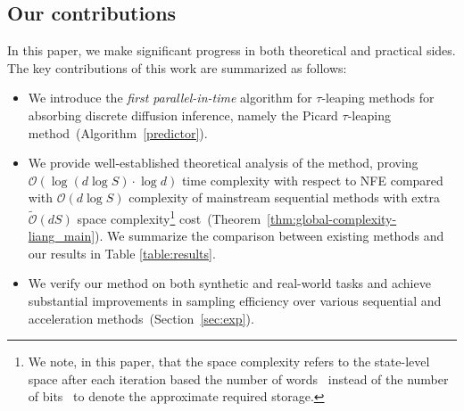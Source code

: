 \documentclass{article}
\begin{document}
\subsection{Our contributions}
In this paper, we make significant progress in both theoretical and practical sides.
The {key contributions} of this work are summarized as follows:
\begin{itemize}[leftmargin =2em]
\item  We introduce the \emph{first} \emph{parallel-in-time} algorithm for $\tau$-leaping methods \citep{campbell2022continuous,gillespie2001approximate} for absorbing discrete diffusion inference, namely the Picard $\tau$-leaping method~(Algorithm~\ref{predictor}).

\item  We provide well-established theoretical analysis of the method, proving ${\mathcal{O}}(\log (d\log S)\cdot \log d)$ time complexity with respect to NFE compared with ${\mathcal{O}}(d \log S)$ complexity of mainstream sequential methods with extra $\widetilde{\mathcal{O}}(dS)$ space complexity\footnote{We note, in this paper, that the space complexity refers to the state-level space after each iteration based the number of words~\citep{cohen2023streaming} instead of the number of bits~\citep{goldreich2008computational} to denote the
approximate required storage.} cost~(Theorem~\ref{thm:global-complexity-liang_main}). We summarize the comparison between existing methods and our results in Table \ref{table:results}.

\item  We verify our method on both synthetic and real-world tasks and achieve substantial improvements in sampling efficiency over various sequential and acceleration methods~(Section~\ref{sec:exp}). 
\end{itemize}
\end{document}
